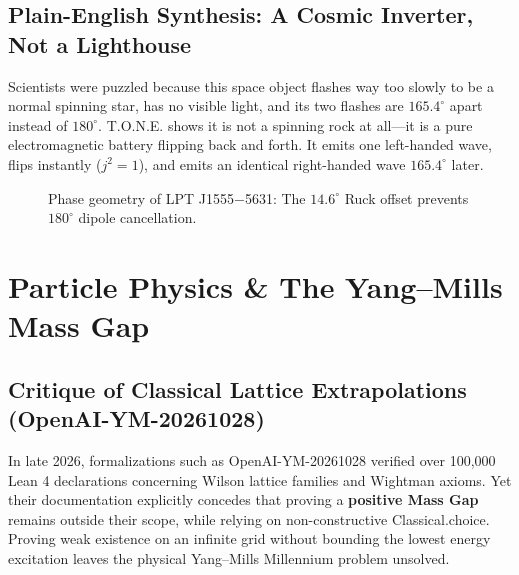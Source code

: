 \documentclass[11pt,a4paper,oneside]{article}
\def\texttt#1{#1}%
\theoremstyle{definition}
\begin{document}
\subsection{Plain-English Synthesis: A Cosmic Inverter, Not a Lighthouse}
\begin{noobbox}
Scientists were puzzled because this space object flashes way too slowly to be a normal spinning star, has no visible light, and its two flashes are $165.4^\circ$ apart instead of $180^\circ$. T.O.N.E. shows it is not a spinning rock at all—it is a pure electromagnetic battery flipping back and forth. It emits one left-handed wave, flips instantly ($j^2=1$), and emits an identical right-handed wave $165.4^\circ$ later.
\end{noobbox}
\begin{figure}[h]
\centering
{}
\caption{Phase geometry of \texttt{LPT J1555$-$5631}: The $14.6^\circ$ Ruck offset prevents $180^\circ$ dipole cancellation.}
\end{figure}

\section{Particle Physics \& The Yang–Mills Mass Gap}
\subsection{Critique of Classical Lattice Extrapolations (\texttt{OpenAI-YM-20261028})}
In late 2026, formalizations such as \texttt{OpenAI-YM-20261028} verified over 100,000 Lean 4 declarations concerning Wilson lattice families and Wightman axioms. Yet their documentation explicitly concedes that proving a \textbf{positive Mass Gap} remains outside their scope, while relying on non-constructive \texttt{Classical.choice}. Proving weak existence on an infinite grid without bounding the lowest energy excitation leaves the physical Yang–Mills Millennium problem unsolved.
\end{document}
